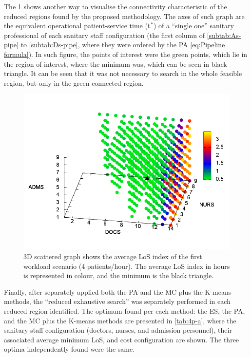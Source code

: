 The \ref{fig:3D-scattered-graph-25} shows another way to visualise
the connectivity characteristic of the reduced regions found by the
proposed methodology. The axes of such graph are the equivalent operational
patient-service time ({\bf t$^*$}) of a ``single
one'' sanitary professional of each sanitary staff configuration
(the first column of \ref{subtab:As-pipe} to \ref{subtab:Ds-pipe},
where they were ordered by the PA \ref{eq:Pipeline formula}). In
such figure, the points of interest were the green points, which lie
in the region of interest, where the minimum was, which can be seen
in black triangle. It can be seen that it was not necessary to search
in the whole feasible region, but only in the green connected region. 

\begin{figure}[h]
\noindent \begin{centering}
\includegraphics[width=0.95\columnwidth,height=0.2\paperheight]{figs4/v0/6400-602-25-3D-scatter-LoS2}
\par\end{centering}

\caption{3D scattered graph shows the average LoS index of the first workload
scenario (4 patients/hour). The average LoS index in hours is represented
in colour, and the minimum is the black triangle.\label{fig:3D-scattered-graph-25} }
\end{figure}


Finally, after separately applied both the PA and the MC plus the
K-means methods, the \textquotedblleft{}reduced exhaustive search\textquotedblright{}
was separately performed in each reduced region identified. The optimum
found per each method: the ES, the PA, and the MC plus the K-means
methods are presented in \ref{tab:4p-a}, where the sanitary staff
configuration (doctors, nurses, and admission personnel), their associated
average minimum LoS, and cost configuration are shown. The three optima
independently found were the same. 


